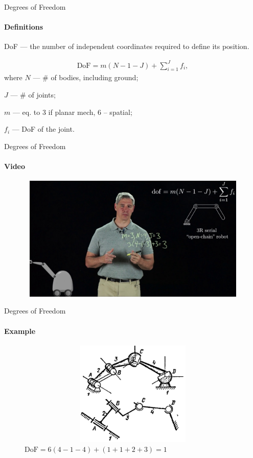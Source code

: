 \documentclass[aspectratio=169]{beamer}
\begin{document}
\begin{frame}[t]{Degrees of Freedom}
\framesubtitle{Definitions}
    DoF --- the number of independent coordinates required to define its position.

    \begin{align*}
        \text{DoF}=m(N-1-J) + \sum_{i=1}^{J}f_i,
    \end{align*}
    where $N$ --- \# of bodies, including ground;
    
    $J$ --- \# of joints;
    
    $m$ --- eq. to 3 if planar mech, 6 -- spatial;
    
    $f_i$ --- DoF of the joint.
\end{frame}


\begin{frame}[t]{Degrees of Freedom}
\framesubtitle{Video}
\vspace{-0.6cm}
\begin{figure}[H]
    \href{https://youtu.be/zI64DyaRUvQ}{
        \centering\includegraphics[height=6cm,width=1\textwidth,keepaspectratio]{dof_video.jpg}}
    \label{fig:dof_video.jpg}
\end{figure}
\end{frame}

\begin{frame}[t]{Degrees of Freedom}
\framesubtitle{Example}
\vspace{-0.5cm}
\begin{figure}[H]
        \centering\includegraphics[height=5cm,width=1\textwidth,keepaspectratio]{rus2_mech.png}
        \caption*{$\text{DoF}=6(4-1-4) + (1+1+2+3) = 1$}
\end{figure}
\end{frame}
\end{document}
